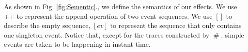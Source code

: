 \documentclass[acmsmall,10pt,review]{acmart}
\newcommand{\es}{\theta}
\newcommand{\ev}{ev}
\newcommand{\code}[1]{{\tt{\ensuremath{\m{#1}}}}}
\newcommand{\m}{\mathit}
\newcommand{\lappend}{\mathrel{\texttt{++}}}
\newcommand{\mysharp}{{\mathrel{\texttt{\#}}}}
\newcommand\figref[1]{Fig. \textcolor{black}{\ref{#1}}.}
\begin{document}
{As shown in \figref{fig:Sementic}, we define the semantics of our effects. 
We use $\lappend$ to represent the append operation of two event sequences. 
We use $[]$ to describe the empty sequence, \code{[\ev]} to represent 
the sequence that only contains one singleton event. 
Notice that, except for the traces constructed by \code{\mysharp}, simple events 
are taken to be happening in instant time. 


\begin{comment}

\begin{figure}[ht]
    \vspace{-1mm}
    \renewcommand{\arraystretch}{1}
\begin{align*} 
&\code{d, \varphi \models \es_1 {\vee} \es_2}  
&\m{iff}\quad 
&  d, \varphi \models \es_1 \ or \ d, \varphi \models \es_2
\\[0.2em]
&\code{d, \varphi \models \pi :  \epsilon }  
&\m{iff}\quad 
&  d{=}0 \ and\  {\tt{SAT}(\pi)}  \ and \ \varphi {=} [] 
\\[0.2em]
&\code{d, \varphi \models  \pi : ev }  &\m{iff}\quad 
& d {\geq} 0 \ and\ {\tt{SAT}(\pi)}  \ and \ 
\varphi {=} \code{[ev]}
  \\[0.2em]
&\code{d, \varphi \models  \pi : (\es_1 \cdot \es_2)}  
&\m{iff}\quad 
& {\tt{SAT}(\pi)}  \ and \ \exists \code{\varphi_1, \varphi_2, d_1, d_2}\ and\ \code{
\varphi {=} \varphi_1 \lappend \varphi_2, d {=} d_1 {+} d_2 \ and 
}\\
& & &
\code{d_1, \varphi_1 \models  \pi : \es_1}  \ and \ 
\code{d_2, \varphi_2 \models  \pi : \es_2}  
 \\[0.2em]
&\code{d, \varphi \models  \pi : (\es_1 {\vee} \es_2)}  
&\m{iff}\quad 
& {\tt{SAT}(\pi)}  \ and \ \code{d, \varphi \models  \pi :  \es_1 } \ or \ 
 \code{d, \varphi \models  \pi :  \es_2}  
\\[0.2em]

\end{comment}}
\end{document}

